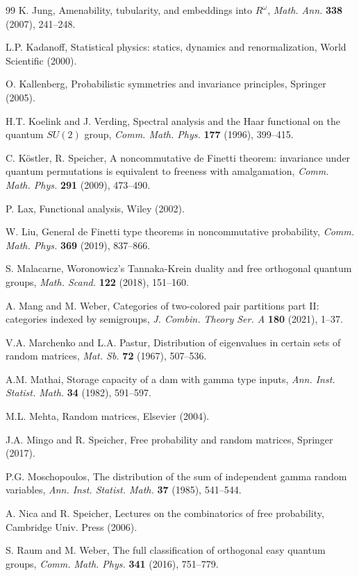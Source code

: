 \documentclass[12pt]{amsbook}
\begin{document}
\begin{thebibliography}{99}
K. Jung, Amenability, tubularity, and embeddings into $R^\omega$, {\em Math. Ann.} {\bf 338} (2007), 241--248.

L.P. Kadanoff, Statistical physics: statics, dynamics and renormalization, World Scientific (2000).

O. Kallenberg, Probabilistic symmetries and invariance principles, Springer (2005).

H.T. Koelink and J. Verding, Spectral analysis and the Haar functional on the quantum $SU(2)$ group, {\em Comm. Math. Phys.} {\bf 177} (1996), 399--415.

C. K\"ostler, R. Speicher, A noncommutative de Finetti theorem: invariance under quantum permutations is equivalent to freeness with amalgamation, {\em Comm. Math. Phys.} {\bf 291} (2009), 473--490.

P. Lax, Functional analysis, Wiley (2002).

W. Liu, General de Finetti type theorems in noncommutative probability, {\em  Comm. Math. Phys.} {\bf 369} (2019), 837--866.

S. Malacarne, Woronowicz's Tannaka-Krein duality and free orthogonal quantum groups, {\em Math. Scand.} {\bf 122} (2018), 151--160.

A. Mang and M. Weber, Categories of two-colored pair partitions part II: categories indexed by semigroups, {\em J. Combin. Theory Ser. A} {\bf 180} (2021), 1--37.

V.A. Marchenko and L.A. Pastur, Distribution of eigenvalues in certain sets of random matrices, {\em Mat. Sb.} {\bf 72} (1967), 507--536.

A.M. Mathai, Storage capacity of a dam with gamma type inputs, {\em Ann. Inst. Statist. Math.} {\bf 34} (1982), 591--597.

M.L. Mehta, Random matrices, Elsevier (2004).

J.A. Mingo and R. Speicher, Free probability and random matrices, Springer (2017).

P.G. Moschopoulos, The distribution of the sum of independent gamma random variables, {\em Ann. Inst. Statist. Math.} {\bf 37} (1985), 541--544. 

A. Nica and R. Speicher, Lectures on the combinatorics of free probability, Cambridge Univ. Press (2006).

S. Raum and M. Weber, The full classification of orthogonal easy quantum groups, {\em Comm. Math. Phys.} {\bf 341} (2016), 751--779.


\end{thebibliography}
\end{document}
